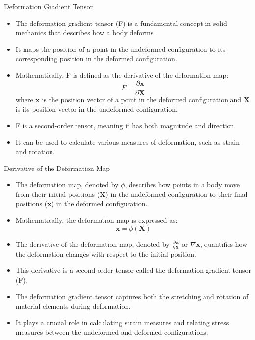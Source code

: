 \documentclass{beamer}
\begin{document}
\begin{frame}{Deformation Gradient Tensor}
    \begin{itemize}
        \item The deformation gradient tensor (F) is a fundamental concept in solid mechanics that describes how a body deforms.
        \item It maps the position of a point in the undeformed configuration to its corresponding position in the deformed configuration.
        \item Mathematically, F is defined as the derivative of the deformation map:
        \begin{equation*}
        F = \frac{\partial \mathbf{x}}{\partial \mathbf{X}}
        \end{equation*}
        where $\mathbf{x}$ is the position vector of a point in the deformed configuration and $\mathbf{X}$ is its position vector in the undeformed configuration.
        \item F is a second-order tensor, meaning it has both magnitude and direction.
        \item It can be used to calculate various measures of deformation, such as strain and rotation.
    \end{itemize}
\end{frame}

\begin{frame}{Derivative of the Deformation Map}
    \begin{itemize}
        \item The deformation map, denoted by $\phi$, describes how points in a body move from their initial positions ($\mathbf{X}$) in the undeformed configuration to their final positions ($\mathbf{x}$) in the deformed configuration.
        \item Mathematically, the deformation map is expressed as:
        \begin{equation*}
        \mathbf{x} = \phi(\mathbf{X})
        \end{equation*}
        \item The derivative of the deformation map, denoted by $\frac{\partial \mathbf{x}}{\partial \mathbf{X}}$ or $\nabla \mathbf{x}$, quantifies how the deformation changes with respect to the initial position.
        \item This derivative is a second-order tensor called the deformation gradient tensor (F).
        \item The deformation gradient tensor captures both the stretching and rotation of material elements during deformation.
        \item It plays a crucial role in calculating strain measures and relating stress measures between the undeformed and deformed configurations.
    \end{itemize}
\end{frame}
\end{document}
